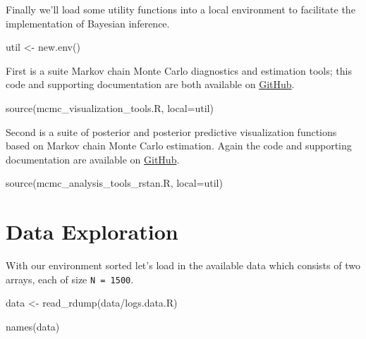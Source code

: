 \documentclass[
  letterpaper,
  DIV=11,
  numbers=noendperiod]{scrartcl}
\newenvironment{Shaded}{\begin{snugshade}}{\end{snugshade}}
\newcommand{\AttributeTok}[1]{\textcolor[rgb]{0.40,0.45,0.13}{#1}}
\newcommand{\FunctionTok}[1]{\textcolor[rgb]{0.28,0.35,0.67}{#1}}
\newcommand{\NormalTok}[1]{\textcolor[rgb]{0.00,0.23,0.31}{#1}}
\newcommand{\OtherTok}[1]{\textcolor[rgb]{0.00,0.23,0.31}{#1}}
\newcommand{\StringTok}[1]{\textcolor[rgb]{0.13,0.47,0.30}{#1}}
\begin{document}
Finally we'll load some utility functions into a local environment to
facilitate the implementation of Bayesian inference.

\begin{Shaded}
\begin{Highlighting}[]
\NormalTok{util }\OtherTok{\textless{}{-}} \FunctionTok{new.env}\NormalTok{()}
\end{Highlighting}
\end{Shaded}

First is a suite Markov chain Monte Carlo diagnostics and estimation
tools; this code and supporting documentation are both available on
\href{https://github.com/betanalpha/mcmc_diagnostics}{GitHub}.

\begin{Shaded}
\begin{Highlighting}[]
\FunctionTok{source}\NormalTok{(}\StringTok{\textquotesingle{}mcmc\_visualization\_tools.R\textquotesingle{}}\NormalTok{, }\AttributeTok{local=}\NormalTok{util)}
\end{Highlighting}
\end{Shaded}

Second is a suite of posterior and posterior predictive visualization
functions based on Markov chain Monte Carlo estimation. Again the code
and supporting documentation are available on
\href{https://github.com/betanalpha/mcmc_visualization_tools}{GitHub}.

\begin{Shaded}
\begin{Highlighting}[]
\FunctionTok{source}\NormalTok{(}\StringTok{\textquotesingle{}mcmc\_analysis\_tools\_rstan.R\textquotesingle{}}\NormalTok{, }\AttributeTok{local=}\NormalTok{util)}
\end{Highlighting}
\end{Shaded}

\section{Data Exploration}\label{data-exploration}

With our environment sorted let's load in the available data which
consists of two arrays, each of size \texttt{N\ =\ 1500}.

\begin{Shaded}
\begin{Highlighting}[]
\NormalTok{data }\OtherTok{\textless{}{-}} \FunctionTok{read\_rdump}\NormalTok{(}\StringTok{\textquotesingle{}data/logs.data.R\textquotesingle{}}\NormalTok{)}

\FunctionTok{names}\NormalTok{(data)}
\end{Highlighting}
\end{Shaded}
\end{document}
